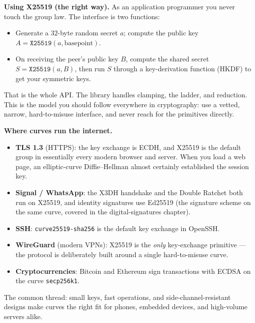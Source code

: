\begin{focusbox}
\textbf{Using X25519 (the right way).} As an application programmer you never touch the
group law. The interface is two functions:
\begin{itemize}
  \item Generate a $32$-byte random secret $a$; compute the public key
        $A = \texttt{X25519}(a, \text{basepoint})$.
  \item On receiving the peer's public key $B$, compute the shared secret
        $S = \texttt{X25519}(a, B)$, then run $S$ through a key-derivation function (HKDF)
        to get your symmetric keys.
\end{itemize}
That is the whole API. The library handles clamping, the ladder, and reduction. This is
the model you should follow everywhere in cryptography: use a vetted, narrow,
hard-to-misuse interface, and never reach for the primitives directly.
\end{focusbox}

\begin{applicationbox}
\textbf{Where curves run the internet.}
\begin{itemize}
  \item \textbf{TLS 1.3} (HTTPS): the key exchange is ECDH, and X25519 is the default
        group in essentially every modern browser and server. When you load a web page,
        an elliptic-curve Diffie--Hellman almost certainly established the session key.
  \item \textbf{Signal / WhatsApp}: the X3DH handshake and the Double Ratchet both run on
        X25519, and identity signatures use Ed25519 (the signature scheme on the same
        curve, covered in the digital-signatures chapter).
  \item \textbf{SSH}: \texttt{curve25519-sha256} is the default key exchange in OpenSSH.
  \item \textbf{WireGuard} (modern VPNs): X25519 is the \emph{only} key-exchange
        primitive --- the protocol is deliberately built around a single hard-to-misuse
        curve.
  \item \textbf{Cryptocurrencies}: Bitcoin and Ethereum sign transactions with ECDSA on
        the curve \texttt{secp256k1}.
\end{itemize}
The common thread: small keys, fast operations, and side-channel-resistant designs make
curves the right fit for phones, embedded devices, and high-volume servers alike.
\end{applicationbox}

